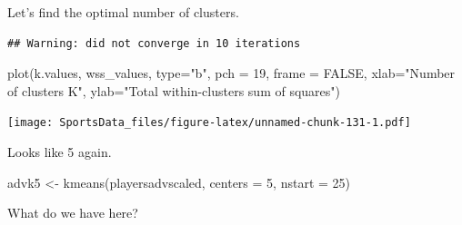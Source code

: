 \documentclass[
]{book}
\newenvironment{Shaded}{\begin{snugshade}}{\end{snugshade}}
\newcommand{\AttributeTok}[1]{\textcolor[rgb]{0.77,0.63,0.00}{#1}}
\newcommand{\CommentTok}[1]{\textcolor[rgb]{0.56,0.35,0.01}{\textit{#1}}}
\newcommand{\ConstantTok}[1]{\textcolor[rgb]{0.00,0.00,0.00}{#1}}
\newcommand{\ControlFlowTok}[1]{\textcolor[rgb]{0.13,0.29,0.53}{\textbf{#1}}}
\newcommand{\DecValTok}[1]{\textcolor[rgb]{0.00,0.00,0.81}{#1}}
\newcommand{\FunctionTok}[1]{\textcolor[rgb]{0.00,0.00,0.00}{#1}}
\newcommand{\NormalTok}[1]{#1}
\newcommand{\OtherTok}[1]{\textcolor[rgb]{0.56,0.35,0.01}{#1}}
\newcommand{\SpecialCharTok}[1]{\textcolor[rgb]{0.00,0.00,0.00}{#1}}
\newcommand{\StringTok}[1]{\textcolor[rgb]{0.31,0.60,0.02}{#1}}
\begin{document}
Let's find the optimal number of clusters.

\begin{Shaded}
\end{Shaded}

\begin{verbatim}
## Warning: did not converge in 10 iterations
\end{verbatim}

\begin{Shaded}
\begin{Highlighting}[]
\FunctionTok{plot}\NormalTok{(k.values, wss\_values,}
       \AttributeTok{type=}\StringTok{"b"}\NormalTok{, }\AttributeTok{pch =} \DecValTok{19}\NormalTok{, }\AttributeTok{frame =} \ConstantTok{FALSE}\NormalTok{, }
       \AttributeTok{xlab=}\StringTok{"Number of clusters K"}\NormalTok{,}
       \AttributeTok{ylab=}\StringTok{"Total within{-}clusters sum of squares"}\NormalTok{)}
\end{Highlighting}
\end{Shaded}

\texttt{[image: SportsData\_files/figure-latex/unnamed-chunk-131-1.pdf]}

Looks like 5 again.

\begin{Shaded}
\begin{Highlighting}[]
\NormalTok{advk5 }\OtherTok{\textless{}{-}} \FunctionTok{kmeans}\NormalTok{(playersadvscaled, }\AttributeTok{centers =} \DecValTok{5}\NormalTok{, }\AttributeTok{nstart =} \DecValTok{25}\NormalTok{)}
\end{Highlighting}
\end{Shaded}

What do we have here?
\end{document}
